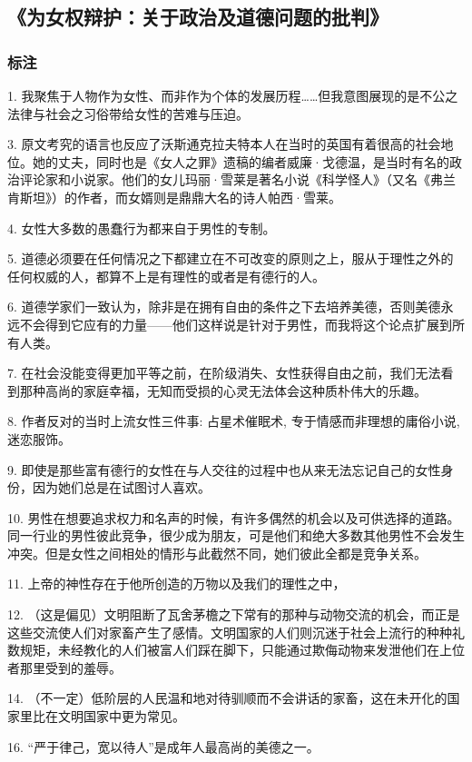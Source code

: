 \subsection{《为女权辩护：关于政治及道德问题的批判》}

\subsubsection{标注}
1. 我聚焦于人物作为女性、而非作为个体的发展历程……但我意图展现的是不公之法律与社会之习俗带给女性的苦难与压迫。

3. 原文考究的语言也反应了沃斯通克拉夫特本人在当时的英国有着很高的社会地位。她的丈夫，同时也是《女人之罪》遗稿的编者威廉·戈德温，是当时有名的政治评论家和小说家。他们的女儿玛丽·雪莱是著名小说《科学怪人》（又名《弗兰肯斯坦》）的作者，而女婿则是鼎鼎大名的诗人帕西·雪莱。

4. 女性大多数的愚蠢行为都来自于男性的专制。

5. 道德必须要在任何情况之下都建立在不可改变的原则之上，服从于理性之外的任何权威的人，都算不上是有理性的或者是有德行的人。

6. 道德学家们一致认为，除非是在拥有自由的条件之下去培养美德，否则美德永远不会得到它应有的力量——他们这样说是针对于男性，而我将这个论点扩展到所有人类。

7. 在社会没能变得更加平等之前，在阶级消失、女性获得自由之前，我们无法看到那种高尚的家庭幸福，无知而受损的心灵无法体会这种质朴伟大的乐趣。

8. 作者反对的当时上流女性三件事: 占星术催眠术, 专于情感而非理想的庸俗小说, 迷恋服饰。

9. 即使是那些富有德行的女性在与人交往的过程中也从来无法忘记自己的女性身份，因为她们总是在试图讨人喜欢。

10. 男性在想要追求权力和名声的时候，有许多偶然的机会以及可供选择的道路。同一行业的男性彼此竞争，很少成为朋友，可是他们和绝大多数其他男性不会发生冲突。但是女性之间相处的情形与此截然不同，她们彼此全都是竞争关系。

11. 上帝的神性存在于他所创造的万物以及我们的理性之中，

12. （这是偏见）文明阻断了瓦舍茅檐之下常有的那种与动物交流的机会，而正是这些交流使人们对家畜产生了感情。文明国家的人们则沉迷于社会上流行的种种礼数规矩，未经教化的人们被富人们踩在脚下，只能通过欺侮动物来发泄他们在上位者那里受到的羞辱。

14. （不一定）低阶层的人民温和地对待驯顺而不会讲话的家畜，这在未开化的国家里比在文明国家中更为常见。

16. “严于律己，宽以待人”是成年人最高尚的美德之一。

